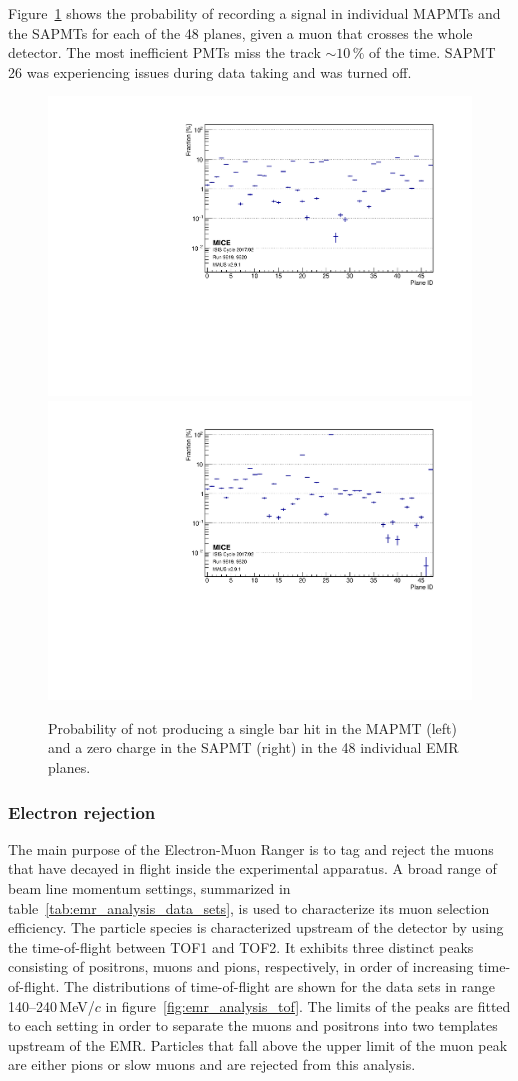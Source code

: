 Figure~\ref{fig:emr_plane_eff} shows the probability of recording a signal in individual MAPMTs and the SAPMTs for each of the 48 planes, given a muon that crosses the whole detector. The most inefficient PMTs miss the track $\sim10\,\%$ of the time. SAPMT 26 was experiencing issues during data taking and was turned off.

\begin{figure}[htb!]
	\begin{center}
		\includegraphics[width=0.49\columnwidth]{missed_mapmt.pdf}
		\hfill
		\includegraphics[width=0.49\columnwidth]{missed_sapmt.pdf}
		\caption{Probability of not producing a single bar hit in the MAPMT (left) and a zero charge in the SAPMT (right) in the 48 individual EMR planes.}
		\label{fig:emr_plane_eff}
	\end{center}
\end{figure}

\subsubsection{Electron rejection}
The main purpose of the Electron-Muon Ranger is to tag and reject the muons that have decayed in flight inside the experimental apparatus. A broad range of beam line momentum settings, summarized in table~\ref{tab:emr_analysis_data_sets}, is used to characterize its muon selection efficiency. The particle species is characterized upstream of the detector by using the time-of-flight between TOF1 and TOF2. It exhibits three distinct peaks consisting of positrons, muons and pions, respectively, in order of increasing time-of-flight. The distributions of time-of-flight are shown for the data sets in range 140--240\,MeV/$c$ in figure~\ref{fig:emr_analysis_tof}. The limits of the peaks are fitted to each setting in order to separate the muons and positrons into two templates upstream of the EMR. Particles that fall above the upper limit of the muon peak are either pions or slow muons and are rejected from this analysis.


